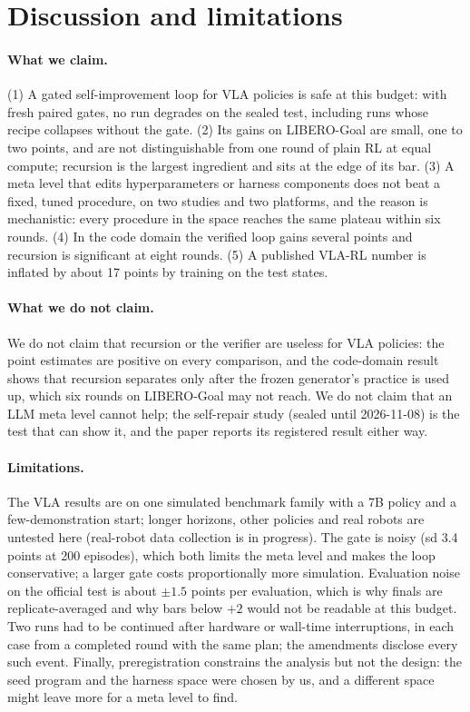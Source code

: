 \section{Discussion and limitations}
\label{sec:discussion}

\paragraph{What we claim.} (1) A gated self-improvement loop for VLA policies is safe at this budget: with fresh paired gates, no run degrades on the sealed test, including runs whose recipe collapses without the gate. (2) Its gains on LIBERO-Goal are small, one to two points, and are not distinguishable from one round of plain RL at equal compute; recursion is the largest ingredient and sits at the edge of its bar. (3) A meta level that edits hyperparameters or harness components does not beat a fixed, tuned procedure, on two studies and two platforms, and the reason is mechanistic: every procedure in the space reaches the same plateau within six rounds. (4) In the code domain the verified loop gains several points and recursion is significant at eight rounds. (5) A published VLA-RL number is inflated by about 17 points by training on the test states.

\paragraph{What we do not claim.} We do not claim that recursion or the verifier are useless for VLA policies: the point estimates are positive on every comparison, and the code-domain result shows that recursion separates only after the frozen generator's practice is used up, which six rounds on LIBERO-Goal may not reach. We do not claim that an LLM meta level cannot help; the self-repair study (sealed until 2026-11-08) is the test that can show it, and the paper reports its registered result either way.

\paragraph{Limitations.} The VLA results are on one simulated benchmark family with a 7B policy and a few-demonstration start; longer horizons, other policies and real robots are untested here (real-robot data collection is in progress). The gate is noisy (sd 3.4 points at 200 episodes), which both limits the meta level and makes the loop conservative; a larger gate costs proportionally more simulation. Evaluation noise on the official test is about $\pm1.5$ points per evaluation, which is why finals are replicate-averaged and why bars below $+2$ would not be readable at this budget. Two runs had to be continued after hardware or wall-time interruptions, in each case from a completed round with the same plan; the amendments disclose every such event. Finally, preregistration constrains the analysis but not the design: the seed program and the harness space were chosen by us, and a different space might leave more for a meta level to find.
